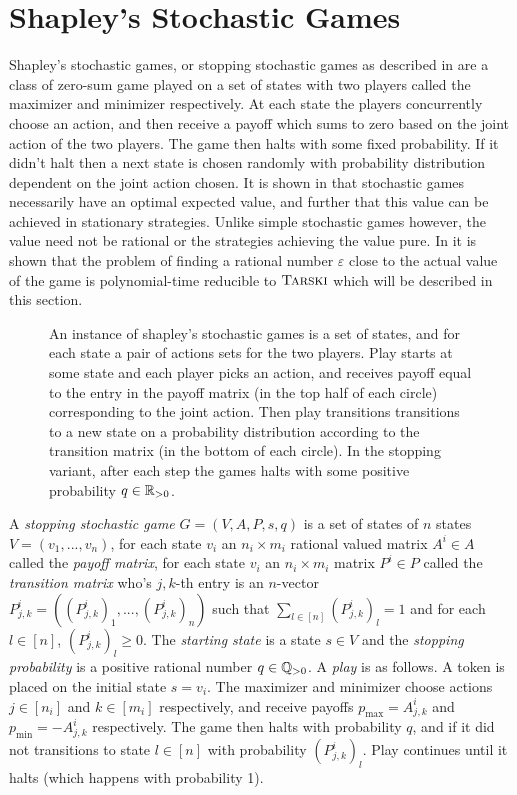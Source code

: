 \section{Shapley's Stochastic Games} \label{shapleyChap}
Shapley's stochastic games, or stopping stochastic games as described in \citep{shapley}
are a class of zero-sum game played on a set of states with two players
called the maximizer and minimizer respectively.
At each state the players concurrently choose an action,  
and then receive a payoff which sums to zero based on the joint
action of the two players. The game then halts with some fixed probability.
If it didn't halt then a next state is chosen randomly with probability distribution
dependent on the joint action chosen.
It is shown in \citep{shapley} that stochastic games necessarily have an optimal expected value,
and further that this value can be achieved in stationary strategies. Unlike
simple stochastic games however, the value need not be rational or the strategies
achieving the value pure. In \citep{lowerBound} it is shown that the  problem
of finding a rational number $\varepsilon$ close to the actual value of the game
is polynomial-time reducible to $\textsc{Tarski}$ which will be described in this section.
\begin{figure}[h]
  \centering
  \scalebox{0.6}{}
  \caption{An instance of shapley's stochastic games is a set of states,
  and for each state a pair of actions sets for the two players.
  Play starts at some state and each player picks an action, and receives payoff equal to the entry in
  the payoff matrix (in the top half of each circle) corresponding
  to the joint action. Then play transitions transitions to a new state 
  on a probability distribution 
  according to the transition matrix (in the bottom of each circle). In the
  stopping variant, after each step the games halts with some
  positive probability $q \in \mathbb{R}_{> 0}$.} 
\end{figure}
\begin{definition}
  A \emph{stopping stochastic game} $G = (V, A, P, s, q)$ is a set of states of $n$ states
  $V = (v_1, ..., v_n)$, for each state $v_i$ an $n_i \times m_i$ rational valued matrix $A^i \in A$ called
  the \emph{payoff matrix}, for each state $v_i$ an $n_i \times m_i$ matrix $P^i \in P$ called
  the \emph{transition matrix} who's $j, k$-th entry is an $n$-vector 
  $P_{j, k}^i = \left((P_{j, k}^i)_1, ..., (P_{j, k}^i)_n \right)$
  such that $\sum_{l \in [n]} (P_{j, k}^i)_l = 1$ and for each $l \in [n]$, $(P_{j, k}^i)_l \geq 0$.
  The \emph{starting state} is a state $s \in V$ and the \emph{stopping probability} is a positive
  rational number $q \in \mathbb{Q}_{> 0}$. A \emph{play} is as follows. A token is placed on the initial
  state $s = v_i$. The maximizer and minimizer choose actions $j \in [n_i]$ and $k \in [m_i]$ respectively,
  and receive payoffs $p_{\max} = A_{j, k}^i$ and $p_{\min} = -A_{j, k}^i$ respectively. The game then
  halts with probability $q$, and if it did not transitions to state $l \in [n]$ with probability
  $(P_{j, k}^i)_l$. Play continues until it halts (which happens with probability 1).
\end{definition}
